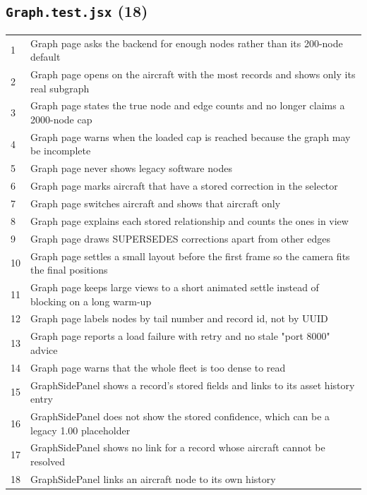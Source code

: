 \subsection*{\texttt{Graph.test.jsx} (18)}
\begin{longtable}{p{}p{}}
1 & Graph page asks the backend for enough nodes rather than its 200-node default \\
2 & Graph page opens on the aircraft with the most records and shows only its real subgraph \\
3 & Graph page states the true node and edge counts and no longer claims a 2000-node cap \\
4 & Graph page warns when the loaded cap is reached because the graph may be incomplete \\
5 & Graph page never shows legacy software nodes \\
6 & Graph page marks aircraft that have a stored correction in the selector \\
7 & Graph page switches aircraft and shows that aircraft only \\
8 & Graph page explains each stored relationship and counts the ones in view \\
9 & Graph page draws SUPERSEDES corrections apart from other edges \\
10 & Graph page settles a small layout before the first frame so the camera fits the final positions \\
11 & Graph page keeps large views to a short animated settle instead of blocking on a long warm-up \\
12 & Graph page labels nodes by tail number and record id, not by UUID \\
13 & Graph page reports a load failure with retry and no stale "port 8000" advice \\
14 & Graph page warns that the whole fleet is too dense to read \\
15 & GraphSidePanel shows a record's stored fields and links to its asset history entry \\
16 & GraphSidePanel does not show the stored confidence, which can be a legacy 1.00 placeholder \\
17 & GraphSidePanel shows no link for a record whose aircraft cannot be resolved \\
18 & GraphSidePanel links an aircraft node to its own history \\
\end{longtable}
